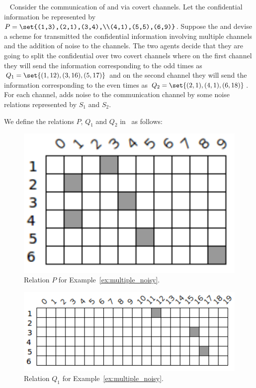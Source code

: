 \begin{example}~
\label{ex:multiple_noisy}
	Consider the communication of \AgentOne and \AgentTwo via covert channels. Let the confidential information be represented by $P = \set{(1,3),(2,1),(3,4),\\(4,1),(5,5),(6,9)}$. Suppose the \AgentOne and \AgentTwo devise a scheme for transmitted the confidential information involving multiple channels and the addition of noise to the channels. The two agents decide that they are going to split the confidential over two covert channels where on the first channel they will send the information corresponding to the odd times as $Q_1 = \set{(1,12),(3,16),(5,17)}$ and on the second channel they will send the information corresponding to the even times as  $Q_2 = \set{(2,1),(4,1),(6,18)}$. For each channel, \AgentOne adds noise to the communication channel by some noise relations represented by $S_1$ and $S_2$. \newline 

	We define the relations $P$, $Q_1$ and $Q_2$ in \relview\ as follows: \newpage

	\begin{figure}[ht]
		\centering
		\includegraphics[scale=0.65]{Figures/PDF/Relview/P.pdf}
		\caption{Relation $P$ for Example~\ref{ex:multiple_noisy}.}
		\label{fig:multiple_noisy_p}
	\end{figure}
	
	\begin{figure}[ht]
		\centering
		\includegraphics[scale=0.65]{Figures/PDF/Relview/Q1.pdf}
		\caption{Relation $Q_1$ for Example~\ref{ex:multiple_noisy}.}
		\label{fig:multiple_noisy_q1}
	\end{figure}


\end{example}
